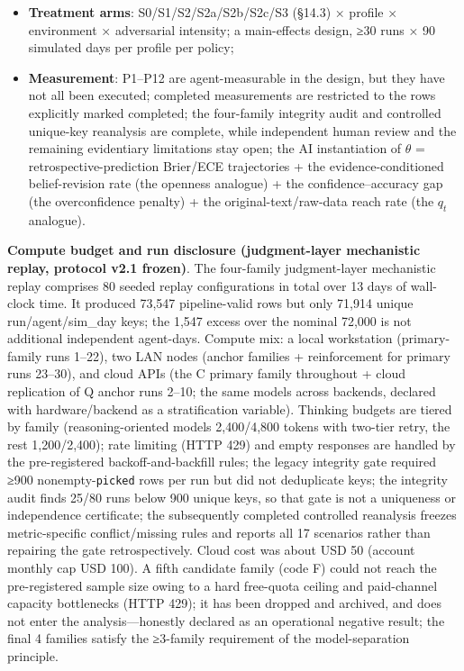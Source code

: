 \documentclass[
  11pt]{article}
\begin{document}
\begin{itemize}
  judging side, team human spot-checks of 10\% are added;
\item
  \textbf{Treatment arms}: S0/S1/S2/S2a/S2b/S2c/S3 (§14.3) × profile ×
  environment × adversarial intensity; a main-effects design, ≥30 runs ×
  90 simulated days per profile per policy;
\item
  \textbf{Measurement}: P1--P12 are agent-measurable in the design, but
  they have not all been executed; completed measurements are restricted
  to the rows explicitly marked completed; the four-family integrity
  audit and controlled unique-key reanalysis are complete, while
  independent human review and the remaining evidentiary limitations
  stay open; the AI instantiation of \(\theta\) =
  retrospective-prediction Brier/ECE trajectories + the
  evidence-conditioned belief-revision rate (the openness analogue) +
  the confidence--accuracy gap (the overconfidence penalty) + the
  original-text/raw-data reach rate (the \(q_t\) analogue).
\end{itemize}

\textbf{Compute budget and run disclosure (judgment-layer mechanistic
replay, protocol v2.1 frozen)}. The four-family judgment-layer
mechanistic replay comprises 80 seeded replay configurations in total
over 13 days of wall-clock time. It produced 73,547 pipeline-valid rows
but only 71,914 unique run/agent/sim\_day keys; the 1,547 excess over
the nominal 72,000 is not additional independent agent-days. Compute
mix: a local workstation (primary-family runs 1--22), two LAN nodes
(anchor families + reinforcement for primary runs 23--30), and cloud
APIs (the C primary family throughout + cloud replication of Q anchor
runs 2--10; the same models across backends, declared with
hardware/backend as a stratification variable). Thinking budgets are
tiered by family (reasoning-oriented models 2,400/4,800 tokens with
two-tier retry, the rest 1,200/2,400); rate limiting (HTTP 429) and
empty responses are handled by the pre-registered backoff-and-backfill
rules; the legacy integrity gate required ≥900 nonempty-\texttt{picked}
rows per run but did not deduplicate keys; the integrity audit finds
25/80 runs below 900 unique keys, so that gate is not a uniqueness or
independence certificate; the subsequently completed controlled
reanalysis freezes metric-specific conflict/missing rules and reports
all 17 scenarios rather than repairing the gate retrospectively. Cloud
cost was about USD 50 (account monthly cap USD 100). A fifth candidate
family (code F) could not reach the pre-registered sample size owing to
a hard free-quota ceiling and paid-channel capacity bottlenecks (HTTP
429); it has been dropped and archived, and does not enter the
analysis---honestly declared as an operational negative result; the
final 4 families satisfy the ≥3-family requirement of the
model-separation principle.
\end{document}
